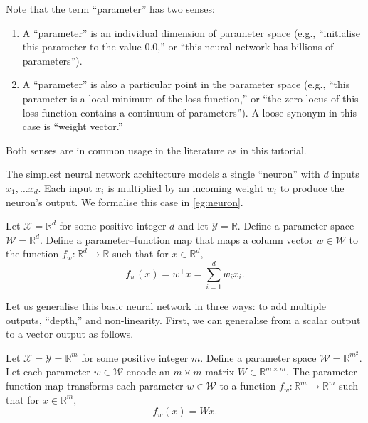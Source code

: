 \documentclass[11pt]{article}
\newcommand{\R}{\mathbb{R}}
\newcommand{\X}{\mathcal{X}}
\newcommand{\Y}{\mathcal{Y}}
\newcommand{\W}{\mathcal{W}}
\begin{document}
\begin{remark}[Parameters]
    Note that the term ``parameter'' has two senses:
    \begin{enumerate}
        \item
            A ``parameter'' is an individual dimension of parameter space
            (e.g., ``initialise this parameter to the value $0.0$,'' or ``this
            neural network has billions of parameters'').
        \item
            A ``parameter'' is also a particular point in the parameter space
            (e.g., ``this parameter is a local minimum of the loss function,''
            or ``the zero locus of this loss function contains a continuum of
            parameters''). A loose synonym in this case is ``weight vector.''
    \end{enumerate}
    Both senses are in common usage in the literature as in this tutorial.
\end{remark}

The simplest neural network architecture models a single ``neuron'' with $d$
inputs $x_1, \ldots x_d$. Each input $x_i$ is multiplied by an incoming weight
$w_i$ to produce the neuron's output. We formalise this case in
\cref{eg:neuron}.

\begin{example}\label{eg:neuron}
    Let $\X = \R^d$ for some positive integer $d$ and let $\Y = \R$. Define a
    parameter space $\W = \R^d$. Define a parameter--function map that maps a
    column vector $w \in \W$ to the function $f_w : \R^d \to \R$ such that for
    $x \in \R^d$,
    \begin{equation}
        f_w(x)
        = w^\top x
        = \sum_{i=1}^d w_i x_i.
    \end{equation}
\end{example}

Let us generalise this basic neural network in three ways: to add multiple
outputs, ``depth,'' and non-linearity. First, we can generalise from a scalar
output to a vector output as follows.

\begin{example}\label{eg:linear}
    Let $\X = \Y = \R^m$ for some positive integer $m$.
    Define a parameter space $\W = \R^{m^2}$. Let each parameter $w \in \W$
    encode an $m \times m$ matrix $W \in \R^{m \times m}$. The
    parameter--function map transforms each parameter $w \in \W$ to a function
    $f_w : \R^m \to \R^m$ such that for $x \in \R^m$,
    \begin{equation}
        f_w(x) = W x.
    \end{equation}
\end{example}
\end{document}
